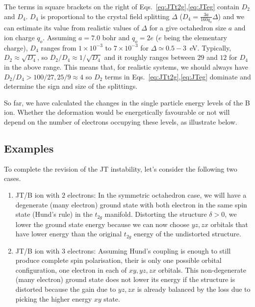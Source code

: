\documentclass[a4paper,prb]{revtex4-1}  %
\begin{document}
The terms in square brackets on the right of Eqs.~\ref{eq:JTt2g},\ref{eq:JTeg}
contain $D_2$ and $D_4$. 
$D_4$ is proportional to the crystal field splitting $\Delta$ 
($D_4=\frac{3a}{160q_o} \Delta$) and 
we can estimate its value from realistic values of $\Delta$ for a give octahedron size $a$ and ion charge $q_o$. 
Assuming $a=7.0$ bohr and $q_o=2e$ ($e$ being the elementary charge),
$D_4$ ranges from $1 \times 10^{-3}$ to  $7 \times 10^{-3}$
for $\Delta \simeq 0.5-3$~eV.
Typically, ${D_{2}\approx \sqrt{D_{4}}}$,
so $D_{2}/D_{4} \approx 1/\sqrt{D_{4}}$
and it roughly ranges between $29$ and $12$ for $D_4$ in the above range.
This means that, for realistic systems, 
we should always have $D_{2}/D_{4} > 100/27, 25/9 \approx 4$
so 
$D_{2}$ terms in 
Eqs.~\ref{eq:JTt2g},\ref{eq:JTeg}
dominate and determine the sign and size of the splittings.


So far, we have calculated the changes in the single particle energy levels of the B ion. 
Whether the deformation would be energetically favourable 
or not will depend on the number of electrons occupying these levels,
as illustrate below.


\subsection{Examples}
To complete the revision of the JT instability,
let's consider the following two cases.
\begin{enumerate}
\item
 JT/B ion with $2$ electrons:
In the symmetric octahedron case, 
we will have a degenerate (many electron) ground state 
with both electron in the same spin state (Hund's rule) in the $t_{2g}$ manifold.
Distorting the structure $\delta>0$, we lower the ground state energy because 
we can now choose $yz,zx$ orbitals that have lower energy than the original $t_{2g}$ energy of the undistorted structure.
\item
 JT/B ion with $3$ electrons:
Assuming Hund's coupling is enough to still produce complete spin polarisation,
their is only one possible orbital configuration, one electron in each of $xy,yz,zx$ orbitals.
This non-degenerate (many electron) ground state
does not lower its energy if the structure is distorted 
because the gain due to $yz,zx$ is already balanced by the loss due to picking the higher energy $xy$ state.
\end{enumerate}

 
\end{document}
